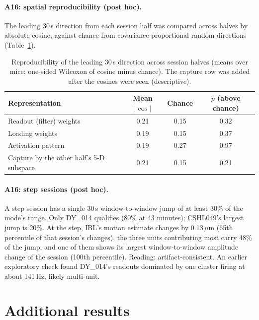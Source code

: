 \documentclass{article}
\begin{document}
\paragraph{A16: spatial reproducibility (post hoc).} The leading 30\,s direction from each session half was compared
across halves by absolute cosine, against chance from covariance-proportional random directions (Table~\ref{tab:repro}).

\begin{table}[H]
  \caption{Reproducibility of the leading 30\,s direction across session halves (means over mice; one-sided Wilcoxon of
  cosine minus chance). The capture row was added after the cosines were seen (descriptive).}
  \label{tab:repro}
  \centering\small
  \begin{tabular}{lccc}
    \toprule
    Representation & Mean $|\cos|$ & Chance & $p$ (above chance) \\
    \midrule
    Readout (filter) weights & 0.21 & 0.15 & 0.32 \\
    Loading weights & 0.19 & 0.15 & 0.37 \\
    Activation pattern \citep{haufe2014} & 0.19 & 0.27 & 0.97 \\
    Capture by the other half's 5-D subspace & 0.21 & 0.15 & 0.21 \\
    \bottomrule
  \end{tabular}
\end{table}

\paragraph{A16: step sessions (post hoc).} A step session has a single 30\,s window-to-window jump of at least 30\% of
the mode's range. Only DY\_014 qualifies (80\% at 43 minutes); CSHL049's largest jump is 20\%. At the step, IBL's motion
estimate changes by 0.13\,$\mu$m (65th percentile of that session's changes), the three units contributing most carry
48\% of the jump, and one of them shows its largest window-to-window amplitude change of the session (100th
percentile). Reading: artifact-consistent. An earlier exploratory check found DY\_014's readouts dominated by one
cluster firing at about 141\,Hz, likely multi-unit.

\section{Additional results}
\label{app:extra}
\end{document}
